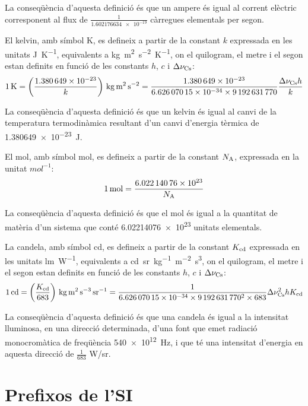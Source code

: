 \begin{list}{}
    La conseqüència d'aquesta definició és que un ampere és igual al corrent elèctric corresponent al flux de $\frac{1}{\num{1,602176634e-19}}$   càrregues elementals per segon.

   \item[\textbf{kelvin}]  El kelvin, amb símbol K, es defineix a partir de la constant $k$ expressada en les unitats \unit{J.K^{-1}},  equivalents a \unit{kg.m^2.s^{-2}.K^{-1}},  on el quilogram, el metre i el segon estan definits en funció de les constants $h$, $c$ i $\Delta\nu_\mathrm{Cs}$:
       \[
            \qty{1}{K} = \left(\frac{\num{1,380649e-23}}{k}\right)\unit{\,kg.m^2.s^{-2}} = \frac{\num{1,380649e-23}}{\num{6,62607015 e-34}\times\num{9192631770}} \frac{\Delta\nu\ped{Cs} h}{k}
       \]

    La conseqüència d'aquesta definició és que un kelvin és igual al canvi de la temperatura termodinàmica resultant d'un canvi d'energia tèrmica de \qty{1,380649e-23}{J}.

   \item[\textbf{mol}]  El mol, amb símbol mol, es defineix a partir de la constant $N_\mathrm{A}$, expressada en la unitat  $\unit{mol^{-1}}$:
       \[
            \qty{1}{mol} = \frac{\num{6,02214076 e23}}{N_\mathrm{A}}
       \]

    La conseqüència d'aquesta definició és que el mol és igual a la quantitat de matèria d'un sistema que conté
    \num{6,02214076 e23} unitats elementals.

   \item[\textbf{candela}] La candela, amb símbol cd, es defineix a partir de la constant $K_\mathrm{cd}$ expressada en les unitats \unit{lm.W^{-1}},  equivalents a \unit{cd.sr.kg^{-1}.m^{-2}.s^3},  on el quilogram, el metre i el segon estan definits en funció de les constants $h$, $c$ i $\Delta\nu_\mathrm{Cs}$:
       \[
            \qty{1}{cd} = \left(\frac{K\ped{cd}}{683}\right)\unit{\,kg.m^2.s^{-3}.sr^{-1}} = \frac{1}{\num{6,62607015 e-34}\times\num{9192631770}^2\times 683} \Delta\nu\ped{Cs}^2 h K\ped{cd}
       \]

    La conseqüència d'aquesta definició és que una candela és igual a la intensitat lluminosa, en una direcció determinada,   d'una font que emet radiació monocromàtica de freqüència \qty{540e12}{Hz}, i
   que té una intensitat d'energia en aquesta direcció de $\frac{1}{683}$ \unit{W/sr}.
\end{list}


\section{Prefixos de l'SI}

